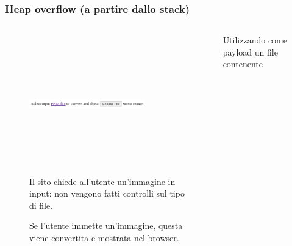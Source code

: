 \documentclass{beamer}
\newcommand\Fontvi{\fontsize{9.5}{7.2}\selectfont}
\begin{document}
\begin{frame}
  \frametitle{Heap overflow (a partire dallo stack)}
  \Fontvi 
  \begin{columns}
    \begin{column}{0.5\textwidth}
      \begin{figure}
        \includegraphics[width=5cm,height=6cm,keepaspectratio]{images/site.png}
        \caption{Il sito chiede all'utente un'immagine in input: non vengono
        fatti controlli sul tipo di file.} 
      \end{figure} 
      \pause
      \begin{figure}
        \caption{Se l'utente immette un'immagine, questa viene convertita
        e mostrata nel browser.}
      \end{figure} 
    \pause
    \end{column}
    \begin{column}{0.5\textwidth}
      Utilizzando come payload un file contenente

\end{column}
\end{columns}
\end{frame}
\end{document}
